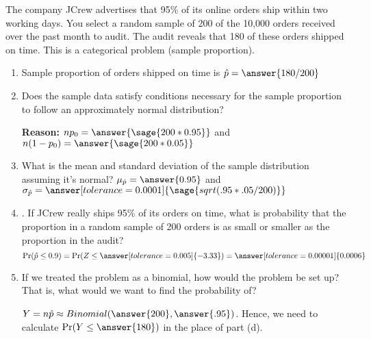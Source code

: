 \documentclass{ximera}
\begin{document}
\begin{problem}
The company JCrew advertises that 95\% of its online orders ship within two working
days. You select a random sample of 200 of the 10,000 orders received over the past month to
audit. The audit reveals that 180 of these orders shipped on time. This is a categorical problem
(sample proportion).
\begin{enumerate}
    \item Sample proportion of orders shipped on time is $\hat p=\answer{180/200}$
 
    \item Does the sample data satisfy conditions necessary for the sample proportion to follow an
approximately normal distribution?
\begin{multipleChoice}
\end{multipleChoice}
{\bf Reason:} $np_0=\answer{\sage{200*0.95}}$
and $n(1-p_0)=\answer{\sage{200*0.05}}$
    
    \item What is the mean and standard deviation of the sample distribution assuming it's normal?
    $\mu_{\hat p}=\answer{0.95}$ and $\sigma_{\hat p}=\answer[tolerance=0.0001]{\sage{sqrt(.95*.05/200)}}$

    \item . If JCrew really ships 95\% of its orders on time, what is probability that the proportion in a
random sample of 200 orders is as small or smaller as the proportion in the audit?
$$\Pr(\hat p \leq 0.9)=\Pr(Z\leq \answer[tolerance=0.005]{-3.33})=\answer[tolerance=0.00001]{0.0006}$$
\item If we treated the problem as a binomial, how would the problem be set up? That is, what
would we want to find the probability of?
\begin{explanation}
$Y=n\hat p \approx Binomial(\answer{200},\answer{.95})$.
Hence, we need to calculate $\Pr(Y\leq \answer{180})$ in the place of part (d). 
\end{explanation}
\end{enumerate}
\end{problem}
\end{document}
